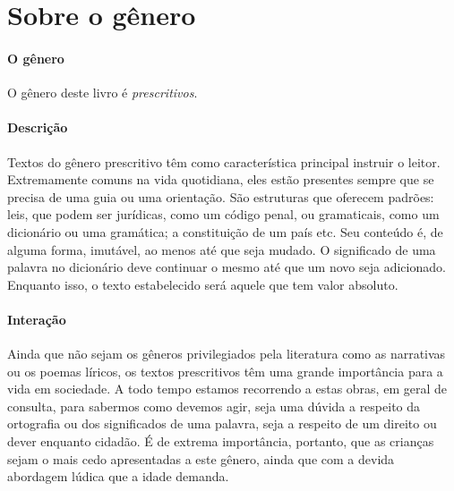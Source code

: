 \documentclass[11pt]{extarticle}
\begin{document}
\section{Sobre o gênero}

\paragraph{O gênero} O gênero deste livro é \textit{prescritivos}. 


\paragraph{Descrição} 
Textos do gênero prescritivo têm como característica principal instruir
o leitor. Extremamente comuns na vida quotidiana, eles estão presentes
sempre que se precisa de uma guia ou uma orientação. São estruturas 
que oferecem padrões: leis, que podem ser jurídicas, como um código
penal, ou gramaticais, como um dicionário ou uma gramática; a constituição
de um país etc. Seu conteúdo é, de alguma forma, imutável, ao menos até que seja
mudado. O significado de uma palavra no dicionário deve continuar o mesmo
até que um novo seja adicionado. Enquanto isso, o texto
estabelecido será aquele que tem valor absoluto.


\paragraph{Interação} 
Ainda que não sejam os gêneros privilegiados pela literatura
como as narrativas ou os poemas líricos, os textos prescritivos
têm uma grande importância para a vida em sociedade. A todo 
tempo estamos recorrendo a estas obras, em geral de consulta, para
sabermos como devemos agir, seja uma dúvida a respeito da ortografia ou 
dos significados de uma palavra, seja a respeito de um direito ou dever
enquanto cidadão. É de extrema importância, portanto, que as crianças
sejam o mais cedo apresentadas a este gênero, ainda que com a 
devida abordagem lúdica que a idade demanda. 


\end{document}
